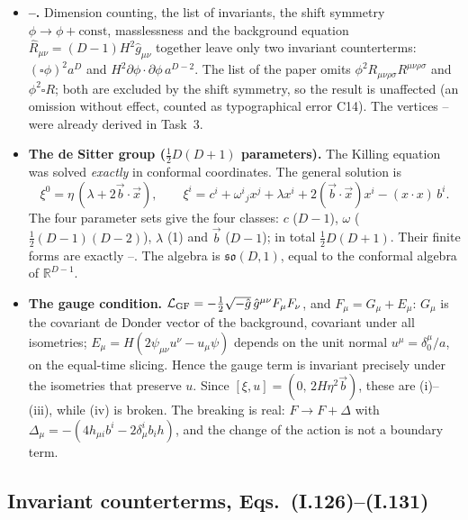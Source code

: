 \begin{resultbox}
\begin{itemize}[leftmargin=12pt]
\item \textbf{--.} Dimension counting, the list of invariants, the shift symmetry $\phi\to\phi+\text{const}$, masslessness and the background equation $\hat R_{\mu\nu}=(D-1)H^2\hat g_{\mu\nu}$ together leave only two invariant counterterms:
$(\square\phi)^2a^D$ and $H^2\partial\phi\cdot\partial\phi\,a^{D-2}$.
The list  of the paper omits $\phi^2R_{\mu\nu\rho\sigma}R^{\mu\nu\rho\sigma}$ and $\phi^2\square R$; both are excluded by the shift symmetry, so the result is unaffected (an omission without effect, counted as typographical error C14).
The vertices -- were already derived in Task~3.
\item \textbf{The de Sitter group ($\tfrac12D(D+1)$ parameters).} The Killing equation was solved \emph{exactly} in conformal coordinates. The general solution is
\begin{equation*}
\xi^0=\eta\,(\lambda+2\vec b\cdot\vec x),\qquad \xi^i=c^i+\omega^i{}_jx^j+\lambda x^i+2(\vec b\cdot\vec x)x^i-(x\cdot x)\,b^i .
\end{equation*}
The four parameter sets give the four classes: $c$ ($D-1$), $\omega$ ($\tfrac12(D-1)(D-2)$), $\lambda$ (1) and $\vec b$ ($D-1$); in total $\tfrac12D(D+1)$.
Their finite forms are exactly --. The algebra is $\mathfrak{so}(D,1)$, equal to the conformal algebra of $\mathbb R^{D-1}$.
\item \textbf{The gauge condition.} $\mathcal{L}_{\mathrm{GF}}=-\tfrac12\sqrt{-\hat g}\,\hat g^{\mu\nu}F_\mu F_\nu$, and $F_\mu=G_\mu+E_\mu$:
$G_\mu$ is the covariant de Donder vector of the background, covariant under all isometries;
$E_\mu=H(2\psi_{\mu\nu}u^\nu-u_\mu\psi)$ depends on the unit normal $u^\mu=\delta^\mu_0/a$, \ie on the equal-time slicing.
Hence the gauge term is invariant precisely under the isometries that preserve $u$.
Since $[\xi,u]=(0,\,2H\eta^2\vec b)$, these are (i)--(iii), while (iv) is broken.
The breaking is real: $F\to F+\Delta$ with $\Delta_\mu=-(4h_{\mu i}b^i-2\delta^i_\mu b_ih)$, and the change of the action is not a boundary term.
\end{itemize}
\end{resultbox}

\subsection{Invariant counterterms, Eqs.~(I.126)--(I.131)}

